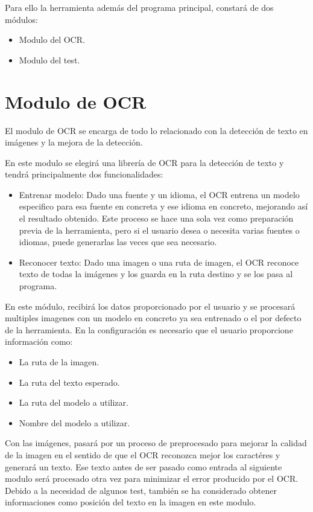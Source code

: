 Para ello la herramienta además del programa principal, constará de dos módulos:
\begin{itemize}
	\item Modulo del OCR.
	\item Modulo del test.
\end{itemize}
\section{Modulo de OCR}
\label{sec:Modulo_OCR_Des}
El modulo de OCR se encarga de todo lo relacionado con la detección de texto en imágenes y la mejora de la detección.

En este modulo se elegirá una librería de OCR para la detección de texto y tendrá principalmente dos funcionalidades: 
\begin{itemize}
	\item Entrenar modelo: Dado una fuente y un idioma, el OCR entrena un modelo especifico para esa fuente en concreta y ese idioma en concreto, mejorando así el resultado obtenido. Este proceso se hace una sola vez como preparación previa de la herramienta, pero si el usuario desea o necesita varias fuentes o idiomas, puede generarlas las veces que sea necesario.
	\item Reconocer texto: Dado una imagen o una ruta de imagen, el OCR reconoce texto de todas la imágenes y los guarda en la ruta destino y se los pasa al programa. 
\end{itemize}
En este módulo, recibirá los datos proporcionado por el usuario y se procesará multiples imagenes con un modelo en concreto ya sea entrenado o el por defecto de la herramienta. En la configuración es necesario que el usuario proporcione información como:
\begin{itemize}
	\item La ruta de la imagen.
	\item La ruta del texto esperado.
	\item La ruta del modelo a utilizar.
	\item Nombre del modelo a utilizar.
\end{itemize}
Con las imágenes, pasará por un proceso de preprocesado para mejorar la calidad de la imagen en el sentido de que el OCR reconozca mejor los caractéres y generará un texto.
Ese texto antes de ser pasado como entrada al siguiente modulo será procesado otra vez para minimizar el error producido por el OCR.
Debido a la necesidad de algunos test, también se ha considerado obtener informaciones como posición del texto en la imagen en este modulo.
